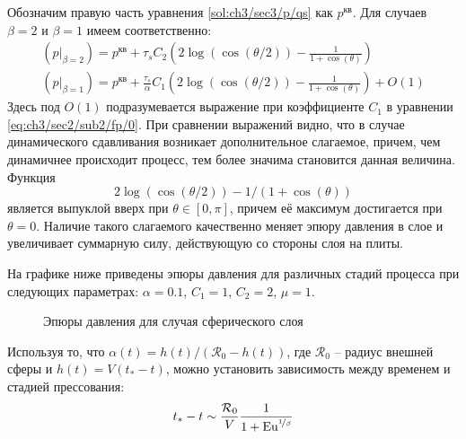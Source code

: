 Обозначим правую часть уравнения \cref{sol:ch3/sec3/p/qs} как $p^\text{кв}$. Для случаев $\beta=2$ и $\beta=1$ имеем соответственно:
\begin{gather}
  \left(p\lvert_{\beta=2}\right) = p^\text{кв} + \tau_{s} C_2 \left(2\log{\left(\cos{\left({\theta / 2}\right)}\right)} - \frac{1}{1+\cos{\left(\theta\right)}}\right)
  \\
  \left(p\lvert_{\beta=1}\right) = p^\text{кв} + \frac{\tau_{s}}{\alpha} C_1 \left(2\log{\left(\cos{\left({\theta / 2}\right)}\right)} - \frac{1}{1+\cos{\left(\theta\right)}}\right) + O(1)
\end{gather}
Здесь под $O(1)$ подразумевается выражение при коэффициенте $C_1$ в уравнении \cref{eq:ch3/sec2/sub2/fp/0}.
При сравнении выражений видно, что в случае динамического сдавливания возникает дополнительное слагаемое, причем, чем динамичнее происходит процесс, тем более значима становится данная величина. Функция
\begin{equation*}
  2\log{\left(\cos{\left({\theta / 2}\right)}\right)} - 1/\left(1+\cos{\left(\theta\right)}\right)
\end{equation*}
является выпуклой вверх при $\theta \in [0, \pi]$, причем её максимум достигается при $\theta=0$.
Наличие такого слагаемого качественно меняет эпюру давления в слое и увеличивает суммарную силу, действующую со стороны слоя на плиты.

На графике ниже приведены эпюры давления для различных стадий процесса при следующих параметрах: $\alpha=0.1$, $C_1=1$, $C_2=2$, $\mu=1$.
\begin{figure}[ht]
  \caption{Эпюры давления для случая сферического слоя}
  \label{fig:ch3/sec3/pressure}
\end{figure}

Используя то, что $\alpha(t) = h(t) / \left(\mathcal{R}_0 - h(t) \right)$, где $\mathcal{R}_0$ -- радиус внешней сферы и $h(t) = V(t_*-t)$, можно установить зависимость между временем и стадией прессования:
\begin{equation}
  t_* - t \sim \frac{\mathcal{R}_0}{V} \frac{1}{1+\text{Eu}^{\nicefrac{1}{\beta}}}
\end{equation}
